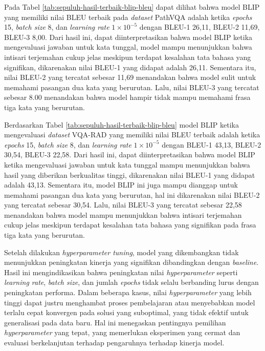 \par Pada Tabel \ref{tab:sepuluh-hasil-terbaik-blip-bleu} dapat dilihat bahwa model BLIP yang memiliki nilai BLEU terbaik pada \textit{dataset} PathVQA adalah ketika \textit{epochs} 15, \textit{batch size} 8, dan \textit{learning rate} $1 \times 10^{-5}$ dengan BLEU-1 26,11, BLEU-2 11,69, BLEU-3 8,00. Dari hasil ini, dapat diinterpretasikan bahwa model BLIP ketika mengevaluasi jawaban untuk kata tunggal, model mampu menunjukkan bahwa intisari terjemahan cukup jelas meskipun terdapat kesalahan tata bahasa yang signifikan, dikarenakan nilai BLEU-1 yang didapat adalah 26,11. Sementara itu, nilai BLEU-2 yang tercatat sebesar 11,69 menandakan bahwa model sulit untuk memahami pasangan dua kata yang berurutan. Lalu, nilai BLEU-3 yang tercatat sebesar 8.00 menandakan bahwa model hampir tidak mampu memahami frasa tiga kata yang berurutan.

Berdasarkan Tabel \ref{tab:sepuluh-hasil-terbaik-blip-bleu} model BLIP ketika mengevaluasi \textit{dataset} VQA-RAD yang memiliki nilai BLEU terbaik adalah ketika \textit{epochs} 15, \textit{batch size} 8, dan \textit{learning rate} $1 \times 10^{-5}$ dengan BLEU-1 43,13, BLEU-2 30,54, BLEU-3 22,58. Dari hasil ini, dapat diinterpretasikan bahwa model BLIP ketika mengevaluasi jawaban untuk kata tunggal mampu menunjukkan bahwa hasil yang diberikan berkualitas tinggi, dikarenakan nilai BLEU-1 yang didapat adalah 43,13. Sementara itu, model BLIP ini juga mampu dianggap untuk memahami pasangan dua kata yang berurutan, hal ini dikarenakan nilai BLEU-2 yang tercatat sebesar 30,54. Lalu, nilai BLEU-3 yang tercatat sebesar 22,58 menandakan bahwa model mampu menunjukkan bahwa intisari terjemahan cukup jelas meskipun terdapat kesalahan tata bahasa yang signifikan pada frasa tiga kata yang berurutan.

\par Setelah dilakukan \textit{hyperparameter tuning}, model yang dikembangkan tidak menunjukkan peningkatan kinerja yang signifikan dibandingkan dengan \textit{baseline}. Hasil ini mengindikasikan bahwa peningkatan nilai \textit{hyperparameter} seperti \textit{learning rate}, \textit{batch size}, dan jumlah \textit{epochs} tidak selalu berbanding lurus dengan peningkatan performa. Dalam beberapa kasus, nilai \textit{hyperparameter} yang lebih tinggi dapat justru menghambat proses pembelajaran atau menyebabkan model terlalu cepat konvergen pada solusi yang suboptimal, yang tidak efektif untuk generalisasi pada data baru. Hal ini menegaskan pentingnya pemilihan \textit{hyperparameter} yang tepat, yang memerlukan eksperimen yang cermat dan evaluasi berkelanjutan terhadap pengaruhnya terhadap kinerja model.
 
